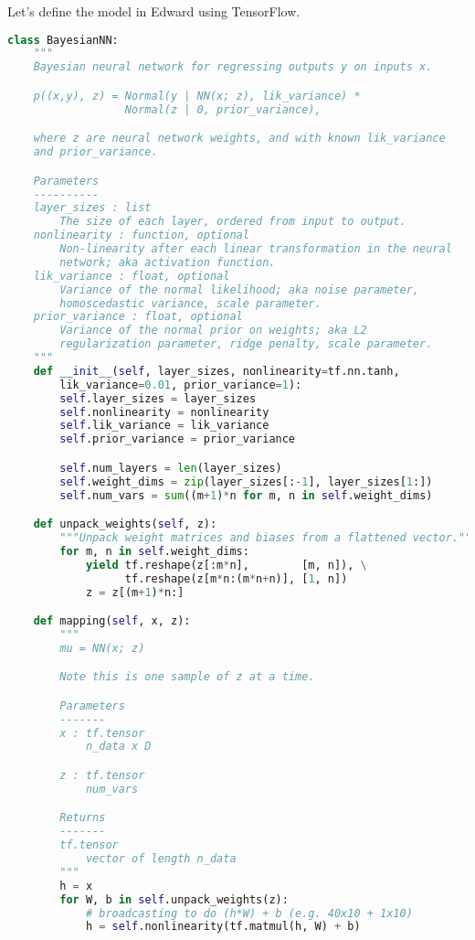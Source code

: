 Let's define the model in Edward using TensorFlow.
\begin{lstlisting}[language=Python]
class BayesianNN:
    """
    Bayesian neural network for regressing outputs y on inputs x.

    p((x,y), z) = Normal(y | NN(x; z), lik_variance) *
                  Normal(z | 0, prior_variance),

    where z are neural network weights, and with known lik_variance
    and prior_variance.

    Parameters
    ----------
    layer_sizes : list
        The size of each layer, ordered from input to output.
    nonlinearity : function, optional
        Non-linearity after each linear transformation in the neural
        network; aka activation function.
    lik_variance : float, optional
        Variance of the normal likelihood; aka noise parameter,
        homoscedastic variance, scale parameter.
    prior_variance : float, optional
        Variance of the normal prior on weights; aka L2
        regularization parameter, ridge penalty, scale parameter.
    """
    def __init__(self, layer_sizes, nonlinearity=tf.nn.tanh,
        lik_variance=0.01, prior_variance=1):
        self.layer_sizes = layer_sizes
        self.nonlinearity = nonlinearity
        self.lik_variance = lik_variance
        self.prior_variance = prior_variance

        self.num_layers = len(layer_sizes)
        self.weight_dims = zip(layer_sizes[:-1], layer_sizes[1:])
        self.num_vars = sum((m+1)*n for m, n in self.weight_dims)

    def unpack_weights(self, z):
        """Unpack weight matrices and biases from a flattened vector."""
        for m, n in self.weight_dims:
            yield tf.reshape(z[:m*n],        [m, n]), \
                  tf.reshape(z[m*n:(m*n+n)], [1, n])
            z = z[(m+1)*n:]

    def mapping(self, x, z):
        """
        mu = NN(x; z)

        Note this is one sample of z at a time.

        Parameters
        -------
        x : tf.tensor
            n_data x D

        z : tf.tensor
            num_vars

        Returns
        -------
        tf.tensor
            vector of length n_data
        """
        h = x
        for W, b in self.unpack_weights(z):
            # broadcasting to do (h*W) + b (e.g. 40x10 + 1x10)
            h = self.nonlinearity(tf.matmul(h, W) + b)


\end{lstlisting}
